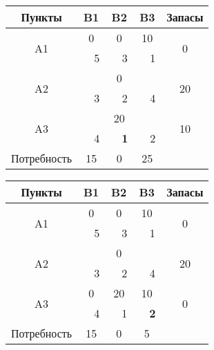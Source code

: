 \documentclass[a4paper,12pt]{article}
\begin{document}
	\begin{center}
		\begin{tabular}{|c|c|c|c|c|c|c|c}
			\hline
			Пункты & \multicolumn{2}{c|}{B1} & \multicolumn{2}{c|}{B2} & \multicolumn{2}{c|}{B3} & \multicolumn{1}{c|}{Запасы} \\ \hline
			\multirow{2}{*}{A1} & \multicolumn{2}{c|}{0} & \multicolumn{2}{c|}{0} & \multicolumn{2}{c|}{10} & \multicolumn{1}{c|}{\multirow{2}{*}{0}} \\ \cline{2-7}
			&  & 5 &  & 3 &  & 1 & \multicolumn{1}{c|}{} \\ \hline
			\multirow{2}{*}{A2} & \multicolumn{2}{c|}{} & \multicolumn{2}{c|}{0} & \multicolumn{2}{c|}{\textbf{}} & \multicolumn{1}{c|}{\multirow{2}{*}{20}} \\ \cline{2-7}
			&  & 3 &  & 2 &  & 4 & \multicolumn{1}{c|}{} \\ \hline
			\multirow{2}{*}{A3} & \multicolumn{2}{c|}{} & \multicolumn{2}{c|}{20} & \multicolumn{2}{c|}{\textbf{}} & \multicolumn{1}{c|}{\multirow{2}{*}{10}} \\ \cline{2-7}
			&  & 4 &  & \textbf{1} &  & 2 & \multicolumn{1}{c|}{} \\ \hline
			Потребность & \multicolumn{2}{c|}{15} & \multicolumn{2}{c|}{0} & \multicolumn{2}{c|}{25} &  \\ \cline{1-7}
		\end{tabular}
		\begin{tabular}{|c|c|c|c|c|c|c|c}
			\hline
			Пункты & \multicolumn{2}{c|}{B1} & \multicolumn{2}{c|}{B2} & \multicolumn{2}{c|}{B3} & \multicolumn{1}{c|}{Запасы} \\ \hline
			\multirow{2}{*}{A1} & \multicolumn{2}{c|}{0} & \multicolumn{2}{c|}{0} & \multicolumn{2}{c|}{10} & \multicolumn{1}{c|}{\multirow{2}{*}{0}} \\ \cline{2-7}
			&  & 5 &  & 3 &  & 1 & \multicolumn{1}{c|}{} \\ \hline
			\multirow{2}{*}{A2} & \multicolumn{2}{c|}{} & \multicolumn{2}{c|}{0} & \multicolumn{2}{c|}{\textbf{}} & \multicolumn{1}{c|}{\multirow{2}{*}{20}} \\ \cline{2-7}
			&  & 3 &  & 2 &  & 4 & \multicolumn{1}{c|}{} \\ \hline
			\multirow{2}{*}{A3} & \multicolumn{2}{c|}{0} & \multicolumn{2}{c|}{20} & \multicolumn{2}{c|}{10} & \multicolumn{1}{c|}{\multirow{2}{*}{0}} \\ \cline{2-7}
			&  & 4 &  & 1 &  & \textbf{2} & \multicolumn{1}{c|}{} \\ \hline
			Потребность & \multicolumn{2}{c|}{15} & \multicolumn{2}{c|}{0} & \multicolumn{2}{c|}{5} &  \\ \cline{1-7}
		\end{tabular}
	\end{center}
\end{document}
